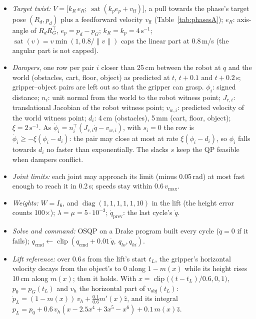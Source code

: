 \documentclass[conference]{IEEEtran}
\begin{document}
\begin{itemize}
  \item \emph{Target twist:} $V=\big[k_R\,e_R;\ \operatorname{sat}(k_p e_p+v_{\text{ff}})\big]$, a pull towards the
    phase's target pose $(R_d,p_d)$ plus a feedforward velocity $v_{\text{ff}}$ (Table~\ref{tab:phasesA});
    $e_R$: axis-angle of $R_dR_G^\top$, $e_p=p_d-p_G$; $k_R=k_p=4\,\text{s}^{-1}$;
    $\operatorname{sat}(v)=v\min(1,0.8/\lVert v\rVert)$ caps the linear part at 0.8\,m/s (the angular part is not
    capped).
  \item \emph{Dampers}, one row per pair $i$ closer than 25\,cm between the robot at $q$ and the world (obstacles,
    cart, floor, object) as predicted at $t$, $t+0.1$ and $t+0.2$\,s; gripper--object pairs are left out so that the
    gripper can grasp. $\phi_i$: signed distance; $n_i$: unit normal from the world to the robot witness point;
    $J_{r,i}$: translational Jacobian of the robot witness point; $v_{w,i}$: predicted velocity of the world
    witness point; $d_i$: 4\,cm (obstacles), 5\,mm (cart, floor, object); $\xi=2\,\text{s}^{-1}$. As
    $\dot\phi_i=n_i^\top(J_{r,i}\dot q-v_{w,i})$, with $s_i=0$ the row is $\dot\phi_i\ge-\xi(\phi_i-d_i)$: the pair
    may close at most at rate $\xi(\phi_i-d_i)$, so $\phi_i$ falls towards $d_i$ no faster than exponentially. The
    slacks $s$ keep the QP feasible when dampers conflict.
  \item \emph{Joint limits:} each joint may approach its limit (minus 0.05\,rad) at most fast enough to reach it in
    0.2\,s; speeds stay within $0.6\,v_{\max}$.
  \item \emph{Weights:} $W=I_6$, and $\operatorname{diag}(1,1,1,1,1,10)$ in the lift (the height error counts
    100$\times$); $\lambda=\mu=5\cdot10^{-3}$; $\dot q_{\text{prev}}$: the last cycle's $\dot q$.
  \item \emph{Solve and command:} OSQP on a Drake program built every cycle ($\dot q=0$ if it fails);
    $q_{\text{cmd}}\leftarrow\operatorname{clip}(q_{\text{cmd}}+0.01\,\dot q,\ q_{lo},q_{hi})$.
  \item \emph{Lift reference:} over 0.6\,s from the lift's start $t_L$, the gripper's horizontal velocity decays from
    the object's to 0 along $1-m(x)$ while its height rises 10\,cm along $m(x)$; then it holds. With
    $x=\operatorname{clip}\big((t-t_L)/0.6,0,1\big)$, $p_0=p_G(t_L)$ and $v_h$ the horizontal part of
    $v_{\text{obj}}(t_L)$: $\dot p_L=(1-m(x))\,v_h+\tfrac{0.1}{0.6}m'(x)\hat z$, and its integral
    $p_L=p_0+0.6\,v_h(x-2.5x^4+3x^5-x^6)+0.1\,m(x)\hat z$.
\end{itemize}
\end{document}
